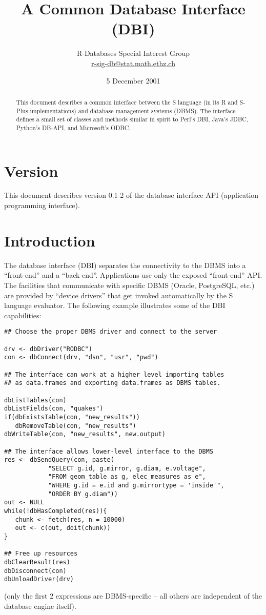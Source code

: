 \documentclass[graphics,times,psfig,dvips,hyper]{article}
\begin{document}
\title{A Common Database Interface (DBI)}
\author{
R-Databases Special Interest Group\\
\href{mailto:r-sig-db@stat.math.ethz.ch}{r-sig-db@stat.math.ethz.ch}
}

\date{5 December 2001}

\maketitle 
\tableofcontents

\begin{abstract}
This document describes a common interface between the S language 
(in its R and S-Plus implementations) and database management systems
(DBMS).  The interface defines a small set of classes and methods
similar in spirit to Perl's DBI, Java's JDBC, Python's DB-API,
and Microsoft's ODBC.
\end{abstract}

\section{Version}\label{sec:version}
This document describes version 0.1-2 of the database interface
API (application programming interface).

\section{Introduction}\label{sec:intro}

The database interface (DBI) separates the connectivity to the DBMS
into a ``front-end'' and a ``back-end''.  Applications use only the
exposed ``front-end'' API.  The facilities that communicate with
specific DBMS (Oracle, PostgreSQL, etc.) are provided by ``device
drivers'' that get invoked automatically by the S language evaluator.
The following example illustrates some of the DBI capabilities:
\begin{verbatim}
## Choose the proper DBMS driver and connect to the server

drv <- dbDriver("RODBC")
con <- dbConnect(drv, "dsn", "usr", "pwd")

## The interface can work at a higher level importing tables 
## as data.frames and exporting data.frames as DBMS tables.

dbListTables(con)
dbListFields(con, "quakes")
if(dbExistsTable(con, "new_results"))
   dbRemoveTable(con, "new_results")
dbWriteTable(con, "new_results", new.output)

## The interface allows lower-level interface to the DBMS
res <- dbSendQuery(con, paste(
            "SELECT g.id, g.mirror, g.diam, e.voltage",
            "FROM geom_table as g, elec_measures as e",
            "WHERE g.id = e.id and g.mirrortype = 'inside'",
            "ORDER BY g.diam"))
out <- NULL
while(!dbHasCompleted(res)){
   chunk <- fetch(res, n = 10000)
   out <- c(out, doit(chunk))
}

## Free up resources
dbClearResult(res)
dbDisconnect(con)
dbUnloadDriver(drv)
\end{verbatim}
(only the first 2 expressions are DBMS-specific -- all others are
independent of the database engine itself).
\end{document}
